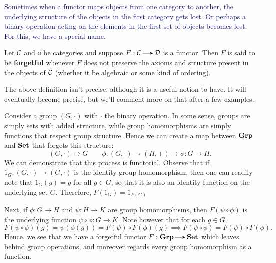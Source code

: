     \textcolor{MidnightBlue}{Sometimes when a functor maps objects 
    from one category to
    another, the underlying structure of the objects in the first
    category gets lost. Or perhaps a binary operation acting on
    the elements in the first set of objects becomes lost. 
    For this, we have a special name.}

    \begin{definition}
        Let $\mathcal{C}$ and $\dd$ be categories and suppose $F: \cc \to
        \dd$ is a functor. Then $F$ is said to be
        \textbf{forgetful} whenever $F$ does not preserve the
        axioms and structure present in the objects of $\mathcal{C}$ (whether it be
        algebraic or some kind of ordering).
    \end{definition}

    The above definition isn't precise, although it is a useful
    notion to have. It will eventually become precise, but we'll comment 
    more on that after a few examples.

    \begin{example}
        Consider a group $(G, \cdot)$ with $\cdot$ the binary operation.
        In some sense, groups are simply sets with added structure, while 
        group homomorphisms are simply functions that respect group structure.
        Hence we can create a map between $\operatorname{\mathbf{Grp}}$ and $\operatorname{\mathbf{Set}}$ that 
        forgets this structure:
        \[
            (G,  \cdot) \mapsto G \qquad \phi: (G, \cdot) \to (H, +) \mapsto \phi: G \to H.
        \]
        We can demonstrate that this process is functorial.
        Observe that if $1_G: (G, \cdot) \to (G, \cdot)$ is the identity group homomorphism, 
        then one can readily note that $1_G(g) = g$ for all $g \in G$, so that it is also an identity function 
        on the underlying set $G$. Therefore, $F(1_G) = 1_{F(G)}$

        Next, if $\phi: G \to H$ and $\psi: H \to K$ are group homomorphisms,  
        then $F(\psi \circ \phi)$ is the underlying function $\psi \circ \phi: G \to K$. 
        Note however that for each $g \in G$,
        \[
            F(\psi \circ \phi)(g) = \psi(\phi(g)) = F(\psi) \circ F(\phi)(g)
            \implies 
            F(\psi \circ \phi) = F(\psi) \circ F(\phi).
        \]  
        Hence, we see that we have a forgetful functor $F: \grp \to \Set$ which 
        leaves behind group operations, and moreover regards every group 
        homomorphism as a function.
    \end{example}

